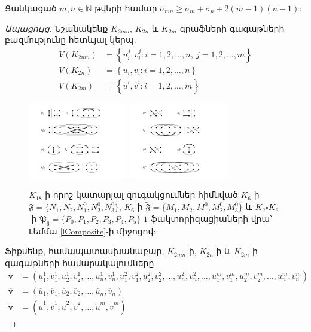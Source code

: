 \begin{hide}
\begin{lemma}\label{lComposite}
Ցանկացած $m,n \in\mathbb{N}$ թվերի համար $\sigma_{mn} \geq \sigma_m + \sigma_n + 2(m-1)(n-1)$:
\end{lemma}
\begin{proof}[Ապացույց]
Նշանակենք $K_{2mn}$, $K_{2n}$ և $K_{2m}$ գրաֆների գագաթների բազմությունը հետևյալ կերպ.
\begin{align*}
V(K_{2mn}) &= \left\{u_i^j,v_i^j : i=1,2,\ldots,n,\ j=1,2,\ldots,m\right\} \\
V(K_{2n}) &= \left\{\overline{u}_i,\overline{v}_i : i=1,2,\ldots,n \right\} \\ 
V(K_{2m}) &= \left\{\widetilde{u}^i,\widetilde{v}^i : i=1,2,\ldots,m \right\} 
\end{align*}


\begin{figure}[t!]
\centering
\includegraphics[width=0.39\textwidth]{figures/K_18-1.pdf}
\hspace{1cm}
\includegraphics[width=0.39\textwidth]{figures/K_18-2.pdf}
\caption{$K_{18}$-ի որոշ կատարյալ զուգակցումներ հիմնված $K_6$-ի $\overline{\mathfrak{F}}=\{N_1,N_2,N_1^0,N_2^0,N_3^0\}$, $K_6$-ի $\widetilde{\mathfrak{F}}=\{M_1,M_2,M_1^0,M_2^0,M_3^0\}$ և $K_2\square K_6$-ի $\mathfrak{P}_6=\{P_0,P_1,P_2,P_3,P_4,P_5\}$ $1$-ֆակտորիզացիաների վրա՝ Լեմմա \ref{lComposite}-ի միջոցով:}
\label{K_18matchings}
\end{figure}


Ֆիքսենք, համապատասխանաբար, $K_{2mn}$-ի, $K_{2n}$-ի և $K_{2m}$-ի գագաթների համարակալումները.
\begin{align*}
\mathbf{v} &= \left(
u^1_1,v^1_1,u^1_2,v^1_2, \ldots, u^1_n,v^1_n,
u^2_1,v^2_1,u^2_2,v^2_2, \ldots, u^2_n,v^2_n, \ldots, 
u^m_1,v^m_1,u^m_2,v^m_2, \ldots, u^m_n,v^m_n \right) \\
\overline{\mathbf{v}} &= \left(
\overline{u}_1,\overline{v}_1,\overline{u}_2,\overline{v}_2, \ldots, \overline{u}_n,\overline{v}_n\right)\\
\widetilde{\mathbf{v}} &= \left(
\widetilde{u}^1,\widetilde{v}^1,\widetilde{u}^2,\widetilde{v}^2, \ldots, \widetilde{u}^m,\widetilde{v}^m\right)
\end{align*}


\end{proof}
\end{hide}
